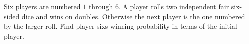 Six players are numbered $1$ through $6$. A player rolls two independent fair six-sided dice and wins on doubles. Otherwise the next player is the one numbered by the larger roll. Find player sixs winning probability in terms of the initial player.
